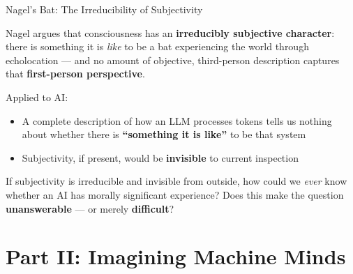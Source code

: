 \documentclass[aspectratio=169,11pt]{beamer}
\begin{document}
\begin{frame}[shrink=3]{Nagel's Bat: The Irreducibility of Subjectivity}
\begin{conceptbox}
\small
Nagel argues that consciousness has an \textbf{irreducibly subjective character}: there is something it is \emph{like} to be a bat experiencing the world through echolocation --- and no amount of objective, third-person description captures that \textbf{first-person perspective}.
\end{conceptbox}

\vspace{0.2cm}
Applied to AI:
\begin{itemize}
    \item A complete description of how an LLM processes tokens tells us nothing about whether there is \textbf{``something it is like''} to be that system
    \item Subjectivity, if present, would be \textbf{invisible} to current inspection
\end{itemize}

\vspace{0.1cm}
\begin{discussionbox}[Discussion]
\scriptsize
If subjectivity is irreducible and invisible from outside, how could we \emph{ever} know whether an AI has morally significant experience? Does this make the question \textbf{unanswerable} --- or merely \textbf{difficult}?
\end{discussionbox}
\end{frame}

\section{Part II: Imagining Machine Minds}
\end{document}
